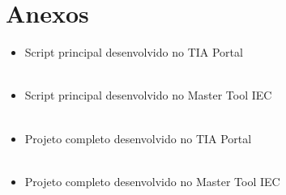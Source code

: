 \documentclass[
	12pt,				%
	openright,			%
	oneside,			%
	a4paper,			%
	english,			%
	brazil,				%
	]{abntex2}
\begin{document}
\chapter{Anexos} \label{anexos}
\begin{itemize}
    \item Script principal desenvolvido no TIA Portal
    \\
    \\
    \item Script principal desenvolvido no Master Tool IEC
    \\
    \\
    \item Projeto completo desenvolvido no TIA Portal
    \\
    \\
    \item Projeto completo desenvolvido no Master Tool IEC
\end{itemize}

\postextual



\end{document}
